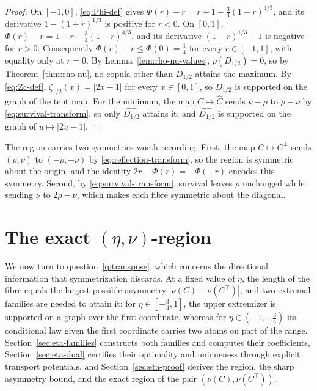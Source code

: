 \documentclass[11pt,a4paper]{article}
\theoremstyle{remark}
\newcommand{\1}{\mathbf{1}}
\begin{document}
\begin{proof}
On $[-1,0]$, \eqref{eq:Phi-def} gives $\Phi(r)-r=r+1-\frac34(1+r)^{4/3}$, and its derivative $1-(1+r)^{1/3}$ is positive for $r<0$.
On $[0,1]$, $\Phi(r)-r=1-r-\frac34(1-r)^{4/3}$, and its derivative $(1-r)^{1/3}-1$ is negative for $r>0$.
Consequently $\Phi(r)-r\le\Phi(0)=\frac14$ for every $r\in[-1,1]$, with equality only at $r=0$.
By Lemma~\ref{lem:rho-nu-values}, $\rho(D_{1/2})=0$, so by Theorem~\ref{thm:rho-nu}, no copula other than $D_{1/2}$ attains the maximum.
By \eqref{eq:Zc-def}, $\zeta_{1/2}(x)=|2x-1|$ for every $x\in[0,1]$, so $D_{1/2}$ is supported on the graph of the tent map.
For the minimum, the map $C\mapsto\widehat C$ sends $\nu-\rho$ to $\rho-\nu$ by \eqref{eq:survival-transform}, so only $\widehat{D_{1/2}}$ attains it, and $\widehat{D_{1/2}}$ is supported on the graph of $u\mapsto|2u-1|$.
\end{proof}

The region carries two symmetries worth recording.
First, the map $C\mapsto C^\perp$ sends $(\rho,\nu)$ to $(-\rho,-\nu)$ by \eqref{eq:reflection-transform}, so the region is symmetric about the origin, and the identity $2r-\Phi(r)=-\Phi(-r)$ encodes this symmetry.
Second, by \eqref{eq:survival-transform}, survival leaves $\rho$ unchanged while sending $\nu$ to $2\rho-\nu$, which makes each fibre symmetric about the diagonal.

\section{\texorpdfstring{The exact $(\eta,\nu)$-region}{The exact (eta,nu)-region}}
\label{sec:eta-nu}

We now turn to question~\ref{q:transpose}, which concerns the directional information that symmetrization discards.
At a fixed value of $\eta$, the length of the fibre equals the largest possible asymmetry $|\nu(C)-\nu(C^\top)|$, and two extremal families are needed to attain it: for $\eta\in[-\frac34,1]$, the upper extremizer is supported on a graph over the first coordinate, whereas for $\eta\in(-1,-\frac34)$ its conditional law given the first coordinate carries two atoms on part of the range.
Section~\ref{sec:eta-families} constructs both families and computes their coefficients, Section~\ref{sec:eta-dual} certifies their optimality and uniqueness through explicit transport potentials, and Section~\ref{sec:eta-proof} derives the region, the sharp asymmetry bound, and the exact region of the pair $(\nu(C),\nu(C^\top))$.
\end{document}

